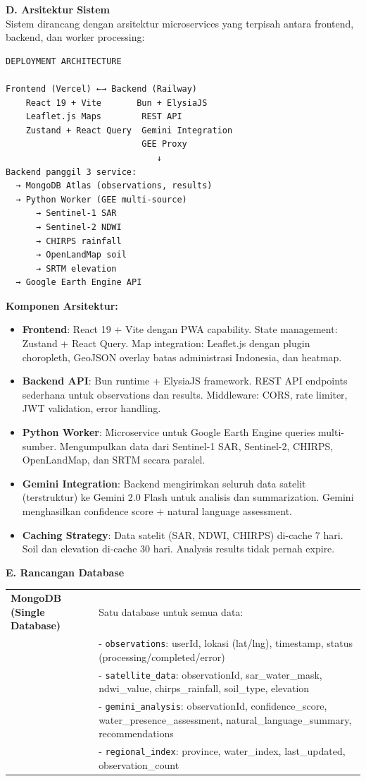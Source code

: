 \documentclass[12pt,a4paper]{article}
\newcommand{\subsectionbox}[1]{%
  \textbf{\large #1}\\[0.3cm]
}
\begin{document}
\subsectionbox{D. Arsitektur Sistem}

Sistem dirancang dengan arsitektur microservices yang terpisah antara frontend, backend, dan worker processing:

\begin{verbatim}
DEPLOYMENT ARCHITECTURE

Frontend (Vercel) ←→ Backend (Railway)
    React 19 + Vite       Bun + ElysiaJS
    Leaflet.js Maps        REST API
    Zustand + React Query  Gemini Integration
                           GEE Proxy
                              ↓
Backend panggil 3 service:
  → MongoDB Atlas (observations, results)
  → Python Worker (GEE multi-source)
      → Sentinel-1 SAR
      → Sentinel-2 NDWI
      → CHIRPS rainfall
      → OpenLandMap soil
      → SRTM elevation
  → Google Earth Engine API
\end{verbatim}

\textbf{Komponen Arsitektur:}

\begin{itemize}
  \item \textbf{Frontend}: React 19 + Vite dengan PWA capability. State management: Zustand + React Query. Map integration: Leaflet.js dengan plugin choropleth, GeoJSON overlay batas administrasi Indonesia, dan heatmap.
  \item \textbf{Backend API}: Bun runtime + ElysiaJS framework. REST API endpoints sederhana untuk observations dan results. Middleware: CORS, rate limiter, JWT validation, error handling.
  \item \textbf{Python Worker}: Microservice untuk Google Earth Engine queries multi-sumber. Mengumpulkan data dari Sentinel-1 SAR, Sentinel-2, CHIRPS, OpenLandMap, dan SRTM secara paralel.
  \item \textbf{Gemini Integration}: Backend mengirimkan seluruh data satelit (terstruktur) ke Gemini 2.0 Flash untuk analisis dan summarization. Gemini menghasilkan confidence score + natural language assessment.
  \item \textbf{Caching Strategy}: Data satelit (SAR, NDWI, CHIRPS) di-cache 7 hari. Soil dan elevation di-cache 30 hari. Analysis results tidak pernah expire.
\end{itemize}

\subsectionbox{E. Rancangan Database}

\begin{tabularx}{\textwidth}{|l|X|}
  \hline
  \textbf{MongoDB (Single Database)} & Satu database untuk semua data: \\[0.2cm]
  & - \texttt{observations}: userId, lokasi (lat/lng), timestamp, status (processing/completed/error) \\[0.2cm]
  & - \texttt{satellite\_data}: observationId, sar\_water\_mask, ndwi\_value, chirps\_rainfall, soil\_type, elevation \\[0.2cm]
  & - \texttt{gemini\_analysis}: observationId, confidence\_score, water\_presence\_assessment, natural\_language\_summary, recommendations \\[0.2cm]
  & - \texttt{regional\_index}: province, water\_index, last\_updated, observation\_count \\
  \hline
\end{tabularx}
\end{document}
